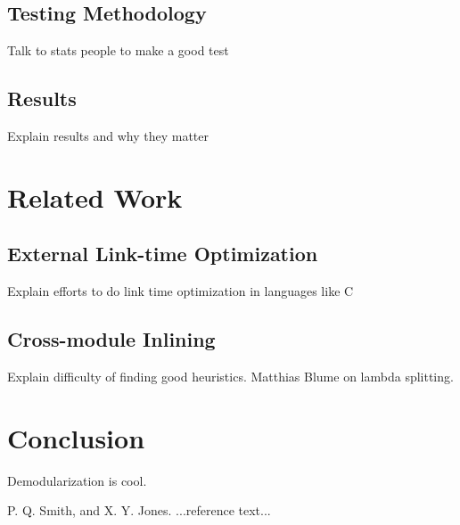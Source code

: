 \documentclass[preprint]{sigplanconf}
\begin{document}
   \subsection{Testing Methodology}

   Talk to stats people to make a good test
   
   \subsection{Results}

   Explain results and why they matter



\section{Related Work}
   \subsection{External Link-time Optimization}

   Explain efforts to do link time optimization in languages like C 
   
   \subsection{Cross-module Inlining}

   Explain difficulty of finding good heuristics. Matthias Blume on lambda splitting.

  

\section{Conclusion}

Demodularization is cool.





\begin{thebibliography}{}
\softraggedright

P. Q. Smith, and X. Y. Jones. ...reference text...

\end{thebibliography}
\end{document}
